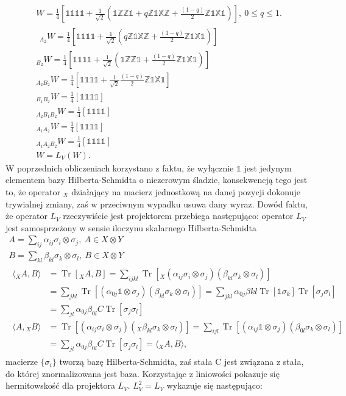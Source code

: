 \documentclass[10pt]{article} %
\DeclareMathOperator{\Trs}{Tr}
\newcommand{\X}{\mathbb{X}}
\newcommand{\Z}{\mathbb{Z}}
\newcommand{\I}{\mathbb{1}}
\begin{document}
\begin{gather}
W = \frac{1}{4}\left[
\I\I\I\I + \frac{1}{\sqrt{2}}(\I\Z\Z\I + q\Z\I\X\Z + \frac{(1-q)}{2}\Z\I\X\I)
\right],~ 0 \leq q \leq 1. \\ 
\begin{split}
{}_{A_2} W =  \frac{1}{4}\left[
\I\I\I\I + \frac{1}{\sqrt{2}}(q\Z\I\X\Z + \frac{(1-q)}{2}\Z\I\X\I)
\right]
\end{split} \\
{}_{B_2}W =  \frac{1}{4}\left[
\I\I\I\I + \frac{1}{\sqrt{2}}(\I\Z\Z\I + \frac{(1-q)}{2}\Z\I\X\I)
\right] \\
{}_{A_2B_2}W = 
 \frac{1}{4}\left[
\I\I\I\I + \frac{1}{\sqrt{2}}\frac{(1-q)}{2}\Z\I\X\I
\right] \\
{}_{B_1B_2}W =  \frac{1}{4}\left[
\I\I\I\I
\right]\\
{}_{A_2B_1B_2}W =  \frac{1}{4}\left[
\I\I\I\I
\right]\\
{}_{A_1A_2}W =  \frac{1}{4}\left[
\I\I\I\I
\right]\\
{}_{A_1A_2B_2}W =  \frac{1}{4}\left[
\I\I\I\I
\right] \\
W = L_V(W).
\end{gather} W poprzednich obliczeniach korzystano z faktu, że wyłącznie $\I$ jest jedynym elementem bazy Hilberta-Schmidta o niezerowym śladzie, konsekwencją tego jest to, że operator ${}_X$ działający na macierz jednostkową na danej pozycji dokonuje trywialnej zmiany, zaś w przeciwnym wypadku usuwa dany wyraz. 
Dowód faktu, że operator $L_V$ rzeczywiście jest projektorem przebiega następująco: operator $L_V$ jest samosprzeżony w sensie iloczynu skalarnego Hilberta-Schmidta
\begin{gather}
A =\sum_{ij} \alpha_{ij} \sigma_i \otimes \sigma_j ,~A \in X \otimes Y \\
B =\sum_{kl} \beta_{kl} \sigma_k \otimes \sigma_l,~B\in X\otimes Y\\
\begin{split}
\langle {}_X A, B \rangle &= \Trs \left[ {}_X A, B\right] = \sum_{ijkl} \Trs\left[ {}_X (\alpha_{ij} \sigma_i \otimes \sigma_j) (\beta_{kl} \sigma_k \otimes \sigma_l)\right] \\
&= \sum_{jkl} \Trs \left[ (\alpha_{0j} \I \otimes \sigma_j) (\beta_{kl} \sigma_k \otimes \sigma_l) \right] = \sum_{jkl} \alpha_{0j} \beta{kl} \Trs \left[ \I \sigma_k\right] \Trs \left[ \sigma_j \sigma_l\right] \\
&= \sum_{jl} \alpha_{0j} \beta_{0l}C \Trs \left[ \sigma_j \sigma_l \right] \\
\langle A, {}_X B \rangle &=  \Trs\left[ (\alpha_{ij} \sigma_i \otimes \sigma_j) ( {}_X \beta_{kl} \sigma_k \otimes \sigma_l)\right] = \sum_{ijl} \Trs \left[ (\alpha_{ij} \I \otimes \sigma_j) (\beta_{0l} \sigma_k \otimes \sigma_l) \right] \\
&= \sum_{jl} \alpha_{0j} \beta_{0l}C \Trs \left[ \sigma_j \sigma_l \right] = \langle {}_X A, B \rangle,
\end{split}
\end{gather} macierze $\{ \sigma_i \}$ tworzą bazę Hilberta-Schmidta, zaś stała C jest związana z stała, do której znormalizowana jest baza. Korzystając z liniowości pokazuje się hermitowskość dla projektora $L_V$. $L_V^2 = L_V$ wykazuje się następująco:
\end{document}
